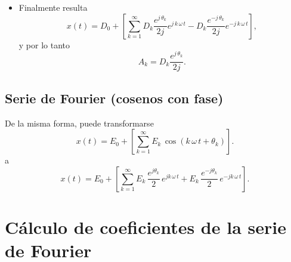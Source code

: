 \begin{itemize}
\item Finalmente resulta
\begin{equation}
        x\left( t\right) =
                D_{0}+
                \left[ 
                        \sum_{k=1}^{\infty}
                                D_{k}\frac{e^{j \, \theta_{k}}}{2 j} e^{j \, k \, \omega \, t } -
                                D_{k}\frac{e^{-j \, \theta_{k}}}{2 j} e^{-j \, k \, \omega \, t}
                \right],
\end{equation}
y por lo tanto
\begin{equation}
  A_{k} = D_{k} \frac{e^{j \, \theta_{k}}}{2 j}.
\end{equation}


\end{itemize}

\subsection{Serie de Fourier (cosenos con fase)}

De la misma forma, puede transformarse
\begin{equation}
 x\left( t\right) =E_{0}+\left[ \sum_{k=1}^{\infty }E_{k} \, \cos \left( k \, \omega \, t+\theta _{k}\right) \right] .
\end{equation}
a
\begin{equation}
        x\left( t\right) =
                E_{0}+
                \left[ 
                        \sum_{k=1}^{\infty}
                                E_{k} \, \frac{e^{j \theta_{k}}}{2} \, e^{j  k \, \omega \, t } +
                                E_{k} \, \frac{e^{-j \theta_{k}}}{2} \, e^{-j  k \, \omega \, t}
                \right] .
\end{equation}

\section{C\'{a}lculo de coeficientes de la serie de Fourier}


